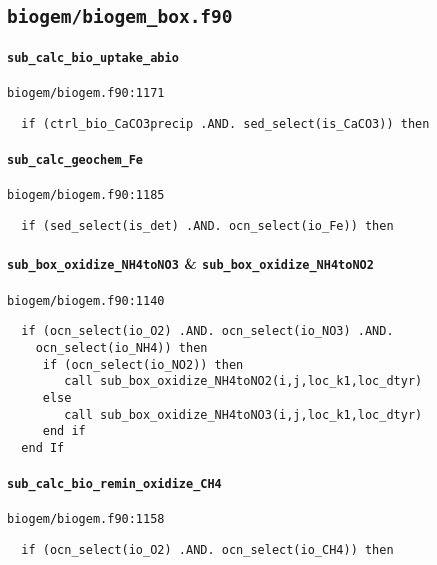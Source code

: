 \documentclass[a4paper,10pt,article]{memoir}
\begin{document}
\subsection*{\texttt{biogem/biogem\_box.f90}}

\paragraph{\texttt{sub\_calc\_bio\_uptake\_abio}}

\texttt{biogem/biogem.f90:1171}

\begin{verbatim}
  if (ctrl_bio_CaCO3precip .AND. sed_select(is_CaCO3)) then
\end{verbatim}

\paragraph{\texttt{sub\_calc\_geochem\_Fe}}

\texttt{biogem/biogem.f90:1185}

\begin{verbatim}
  if (sed_select(is_det) .AND. ocn_select(io_Fe)) then
\end{verbatim}

\paragraph{\texttt{sub\_box\_oxidize\_NH4toNO3} \& \texttt{sub\_box\_oxidize\_NH4toNO2}}

\texttt{biogem/biogem.f90:1140}

\begin{verbatim}
  if (ocn_select(io_O2) .AND. ocn_select(io_NO3) .AND.
    ocn_select(io_NH4)) then
     if (ocn_select(io_NO2)) then
        call sub_box_oxidize_NH4toNO2(i,j,loc_k1,loc_dtyr)
     else
        call sub_box_oxidize_NH4toNO3(i,j,loc_k1,loc_dtyr)
     end if
  end If
\end{verbatim}

\paragraph{\texttt{sub\_calc\_bio\_remin\_oxidize\_CH4}}

\texttt{biogem/biogem.f90:1158}

\begin{verbatim}
  if (ocn_select(io_O2) .AND. ocn_select(io_CH4)) then
\end{verbatim}
\end{document}

